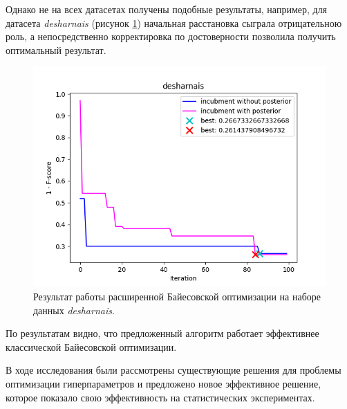 \documentclass[times,specification,annotation]{itmo-student-thesis}
\begin{document}
	Однако не на всех датасетах получены подобные результаты, например, для датасета \textit{desharnais} (рисунок \ref{img:pbo-desharnais}) начальная расстановка сыграла отрицательною роль, а непосредственно корректировка по достоверности позволила получить оптимальный результат.
	\begin{figure}[!ht]
		\caption{Результат работы расширенной Байесовской оптимизации на наборе данных \textit{desharnais}.}\label{img:pbo-desharnais}
		\includegraphics[width=0.85\linewidth]{../png/incubment-iteration-posterior/desharnais}
		\centering
	\end{figure}

	\chapterconclusion
	По результатам видно, что предложенный алгоритм работает эффективнее классической Байесовской оптимизации.
	
	
	\startconclusionpage
	В ходе исследования были рассмотрены существующие решения для проблемы оптимизации гиперпараметров и предложено новое эффективное решение, которое показало свою эффективность на статистических экспериментах.
	
	\printmainbibliography
	
	
	\appendix
\end{document}
